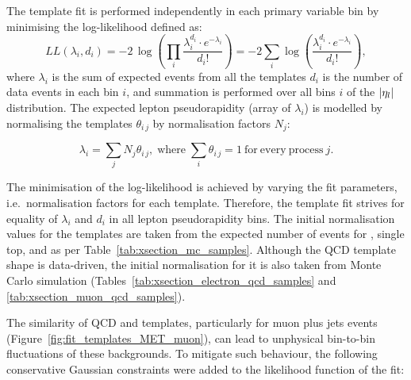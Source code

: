 The template fit is performed independently in each primary variable bin by minimising the log-likelihood defined as:
\begin{equation}
\label{eq:xsection_loglikelihood}
LL(\lambda_i,d_i)=-2\,\log{\left(\prod\limits_{i}\frac{\lambda_i^{d_i}\cdot
e^{-\lambda_i}}{d_i!}\right)}=-2\sum\limits_{i}\log{\left(\frac{\lambda_i^{d_i}\cdot e^{-\lambda_i}}{d_i!}\right)},
\end{equation}
where $\lambda_i$ is the sum of expected events from all the templates $d_i$ is the number of data events in each bin
$i$, and summation is performed over all bins $i$ of the $\lvert \eta_l \rvert$ distribution. The expected lepton
pseudorapidity (array of $\lambda_i$) is modelled by normalising the templates $\theta_{i\,j}$ by normalisation factors
$N_j$:

\begin{equation}
\label{eq:xsection_templates_normalisation}
\lambda_i=\sum\limits_{j}N_j\theta_{i\,j},\;\mathrm{where}\;\sum\limits_{i}\theta_{i\,j}=1~\mathrm{for~every~process}~j.
\end{equation}

The minimisation of the log-likelihood is achieved by varying the fit parameters, i.e.\ normalisation factors for each
template. Therefore, the template fit strives for equality of $\lambda_i$ and $d_i$ in all lepton pseudorapidity bins.
The initial normalisation values for the templates are taken from the expected number of events for \ttbar, single top,
\WpJets and \ZpJets as per Table~\ref{tab:xsection_mc_samples}. Although the QCD template shape is data-driven, the
initial normalisation for it is also taken from Monte Carlo simulation (Tables~\ref{tab:xsection_electron_qcd_samples}
and \ref{tab:xsection_muon_qcd_samples}).

The similarity of QCD and \VpJets templates, particularly for muon plus jets events
(Figure~\ref{fig:fit_templates_MET_muon}), can lead to unphysical bin-to-bin fluctuations of these backgrounds. To
mitigate such behaviour, the following conservative Gaussian constraints were added to the likelihood function of the
fit:

